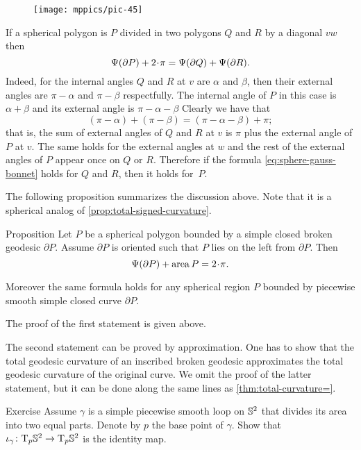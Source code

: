 \begin{wrapfigure}{o}{42 mm}
\vskip-0mm
\centering
\texttt{[image: mppics/pic-45]}
\vskip-0mm
\end{wrapfigure}

If a spherical polygon is $P$ divided in two polygons $Q$ and $R$ by a diagonal $vw$
then 
\[\tgc{\partial P}+2\cdot\pi =\tgc{\partial Q}+\tgc{\partial R}.\]
Indeed, for the internal angles $Q$ and $R$ at $v$ are $\alpha$ and $\beta$,
then their external angles are $\pi-\alpha$ and $\pi-\beta$ respectfully.
The internal angle of $P$ in this case is $\alpha+\beta$ and its external angle is $\pi-\alpha-\beta$
Clearly we have that 
\[(\pi-\alpha)+(\pi-\beta)=(\pi-\alpha-\beta)+\pi;\]
that is, the sum of external angles of $Q$ and $R$ at $v$ is $\pi$ plus the external angle of $P$ at $v$. 
The same holds for the external angles at $w$ and the rest of the external angles of $P$ appear once on $Q$ or $R$.
Therefore if the formula \ref{eq:sphere-gauss-bonnet} holds for $Q$ and $R$,
then it holds for~$P$.

The following proposition summarizes the discussion above.
Note that it is a spherical analog of \ref{prop:total-signed-curvature}.

\begin{thm}{Proposition}\label{prop:area-of-spher-polygon}
Let $P$ be a spherical polygon bounded by a simple closed broken geodesic $\partial P$.
Assume $\partial P$ is oriented such that $P$ lies on the left from $\partial P$.
Then 
\[\tgc{\partial P}+\area P=2\cdot \pi.\]

Moreover the same formula holds for any spherical region $P$ bounded by piecewise smooth simple closed curve $\partial P$.
\end{thm}

The proof of the first statement is given above. 

The second statement can be proved by approximation. One has to show that the total geodesic curvature of an inscribed broken geodesic approximates the total geodesic curvature of the original curve.
We omit the proof of the latter statement, but it can be done along the same lines as \ref{thm:total-curvature=}.
\qeds


\begin{thm}{Exercise}\label{ex:half-sphere-total-curvature}
Assume $\gamma$ is a simple piecewise smooth loop on $\mathbb{S}^2$ that divides its area into two equal parts.
Denote by $p$ the base point of $\gamma$.
Show that $\iota_\gamma\colon\mathrm{T}_p\mathbb{S}^2\to\mathrm{T}_p\mathbb{S}^2$ is the identity map.
\end{thm}

